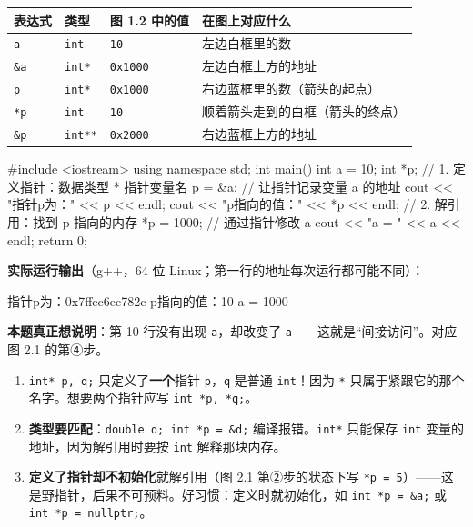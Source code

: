 \documentclass[UTF8,a4paper,11pt,fontset=none,zihao=-4]{ctexart}
\newcommand{\ci}[1]{{\circfont #1}}
\newcommand{\cpp}[1]{\lstinline[style=cpp,basicstyle=\ttfamily,numbers=none]{#1}}
\newcommand{\cc}[1]{\texttt{#1}}
\begin{document}
\begin{center}
\noindent\begin{tabularx}{\linewidth}{@{}p{1.8cm}p{2.2cm}p{2.3cm}Y@{}}
\toprule
{}表达式 & 类型 & 图 1.2 中的值 & 在图上对应什么 \\
\midrule
\cc{a} & \cc{int} & \cc{10} & 左边白框里的数 \\
\cc{\&a} & \cc{int*} & \cc{0x1000} & 左边白框上方的地址 \\
\cc{p} & \cc{int*} & \cc{0x1000} & 右边蓝框里的数（箭头的起点） \\
\cc{*p} & \cc{int} & \cc{10} & 顺着箭头走到的白框（箭头的终点） \\
\cc{\&p} & \cc{int**} & \cc{0x2000} & 右边蓝框上方的地址 \\
\bottomrule
\end{tabularx}
\end{center}

\begin{examplebox}
\begin{code}
#include <iostream>
using namespace std;
int main()
{
    int a = 10;
    int *p;          // 1. 定义指针：数据类型 * 指针变量名
    p = &a;          //    让指针记录变量 a 的地址
    cout << "指针p为：" << p << endl;
    cout << "p指向的值：" << *p << endl;   // 2. 解引用：找到 p 指向的内存
    *p = 1000;       //    通过指针修改 a
    cout << "a = " << a << endl;
    return 0;
}
\end{code}
\textbf{实际运行输出}（g++，64 位 Linux；第一行的地址每次运行都可能不同）：
\begin{codeout}
指针p为：0x7ffcc6ee782c
p指向的值：10
a = 1000
\end{codeout}
\textbf{本题真正想说明}：第 10 行没有出现 \cc{a}，却改变了 \cc{a}——这就是“间接访问”。对应图 2.1 的第\ci{④}步。
\end{examplebox}

\begin{warningbox}
\begin{enumerate}
  \item \cpp{int* p, q;} 只定义了\textbf{一个}指针 \cc{p}，\cc{q} 是普通 \cc{int}！因为 \cc{*} 只属于紧跟它的那个名字。想要两个指针应写 \cpp{int *p, *q;}。
  \item \textbf{类型要匹配}：\cpp{double d; int *p = &d;} 编译报错。\cc{int*} 只能保存 \cc{int} 变量的地址，因为解引用时要按 \cc{int} 解释那块内存。
  \item \textbf{定义了指针却不初始化}就解引用（图 2.1 第\ci{②}步的状态下写 \cc{*p = 5}）——这是野指针，后果不可预料。好习惯：定义时就初始化，如 \cpp{int *p = &a;} 或 \cpp{int *p = nullptr;}。
\end{enumerate}
\end{warningbox}
\end{document}
